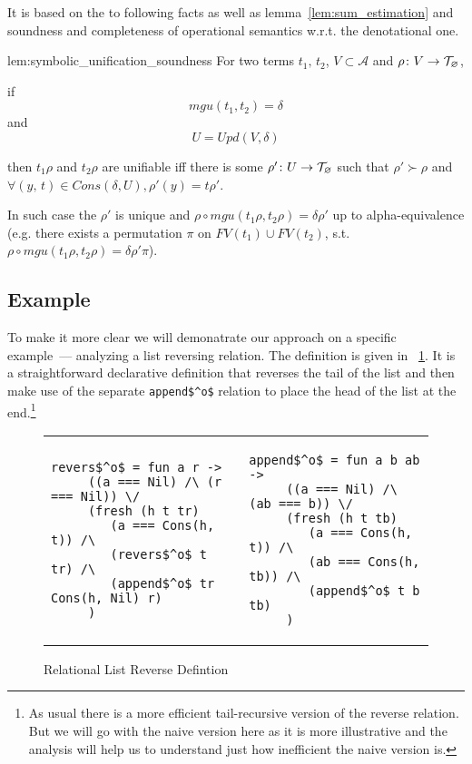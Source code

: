 It is based on the to following facts as well as lemma~\ref{lem:sum_estimation} and soundness and completeness of operational semantics w.r.t. the denotational one.

\begin{replemma}{lem:symbolic_unification_soundness}
For two terms $t_1, \,t_2$, $V \subset \mathcal{A}$ and $\rho \colon V \to \mathcal{T}_{\varnothing}$,

if \[ mgu(t_1, t_2) = \delta \] and \[ U = Upd(V, \delta) \]

then $t_1 \rho$ and $t_2 \rho$ are unifiable iff there is some $\rho' \colon U \to \mathcal{T}_{\varnothing}$ such that $\rho' \succ \rho$ and $\forall (y, \, t) \in Cons(\delta, U), \rho'(y) = t \rho'$.

In such case the $\rho'$ is unique and $\rho \circ mgu(t_1 \rho, t_2 \rho) = \delta \rho' $ up to alpha-equivalence (e.g. there exists a permutation $\pi$ on $FV(t_1) \cup FV(t_2)$, s.t. $ \rho \circ mgu(t_1 \rho, t_2 \rho) = \delta \rho' \pi$).
\end{replemma}
 
 
 
 
 
 
 
 
 
 
 
 
 
\subsection{Example}

To make it more clear we will demonatrate our approach on a specific example~--- analyzing a list reversing relation. The definition is given in \figureword~\ref{fig:reverso_definition}. It is a straightforward declarative definition that reverses the tail of the list and then make use of the separate \lstinline|append$^o$| relation to place the head of the list at the end.\footnote{As usual there is a more efficient tail-recursive version of the reverse relation. But we will go with the naive version here as it is more illustrative and the analysis will help us to understand just how inefficient the naive version is.}

\begin{figure}[t]
\begin{tabular}{p{6cm}p{6cm}}
\begin{lstlisting}[basicstyle=\small]
   revers$^o$ = fun a r ->
     ((a === Nil) /\ (r === Nil)) \/
     (fresh (h t tr)
        (a === Cons(h, t)) /\
        (revers$^o$ t tr) /\
        (append$^o$ tr Cons(h, Nil) r)
     )
\end{lstlisting} &
\begin{lstlisting}[basicstyle=\small]
   append$^o$ = fun a b ab ->
     ((a === Nil) /\ (ab === b)) \/
     (fresh (h t tb)
        (a === Cons(h, t)) /\
        (ab === Cons(h, tb)) /\
        (append$^o$ t b tb)
     )
\end{lstlisting}
\end{tabular}

\caption{Relational List Reverse Defintion}
\label{fig:reverso_definition}
\end{figure}

